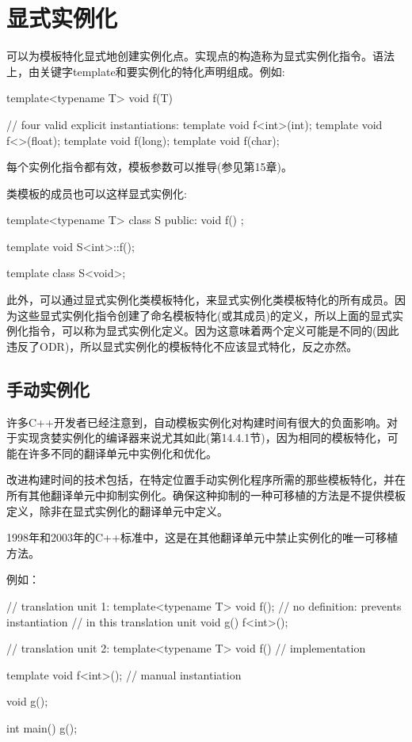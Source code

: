 \section{显式实例化}

可以为模板特化显式地创建实例化点。实现点的构造称为显式实例化指令。语法上，由关键字template和要实例化的特化声明组成。例如:

\begin{cpp}
template<typename T>
void f(T)
{ }

// four valid explicit instantiations:
template void f<int>(int);
template void f<>(float);
template void f(long);
template void f(char);
\end{cpp}

每个实例化指令都有效，模板参数可以推导(参见第15章)。

类模板的成员也可以这样显式实例化:

\begin{cpp}
template<typename T>
class S {
	public:
	void f() {
	}
};

template void S<int>::f();

template class S<void>;
\end{cpp}

此外，可以通过显式实例化类模板特化，来显式实例化类模板特化的所有成员。因为这些显式实例化指令创建了命名模板特化(或其成员)的定义，所以上面的显式实例化指令，可以称为显式实例化定义。因为这意味着两个定义可能是不同的(因此违反了ODR)，所以显式实例化的模板特化不应该显式特化，反之亦然。

\subsection{手动实例化}

许多C++开发者已经注意到，自动模板实例化对构建时间有很大的负面影响。对于实现贪婪实例化的编译器来说尤其如此(第14.4.1节)，因为相同的模板特化，可能在许多不同的翻译单元中实例化和优化。

改进构建时间的技术包括，在特定位置手动实例化程序所需的那些模板特化，并在所有其他翻译单元中抑制实例化。确保这种抑制的一种可移植的方法是不提供模板定义，除非在显式实例化的翻译单元中定义。

\begin{notice}
1998年和2003年的C++标准中，这是在其他翻译单元中禁止实例化的唯一可移植方法。
\end{notice}

例如：

\begin{cpp}
// translation unit 1:
template<typename T> void f(); // no definition: prevents instantiation
								// in this translation unit
void g()
{
	f<int>();
}

// translation unit 2:
template<typename T> void f()
{
	// implementation
}

template void f<int>(); // manual instantiation

void g();

int main()
{
	g();
}
\end{cpp}

